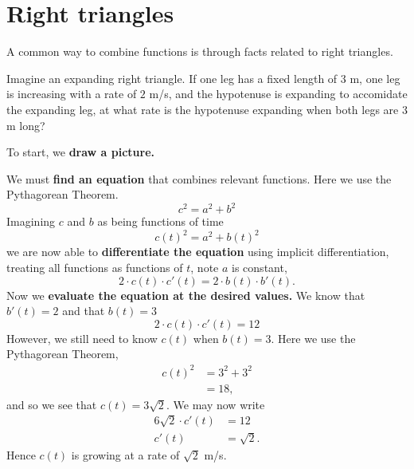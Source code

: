 \documentclass{ximera}
\begin{document}
\section{Right triangles}

A common way to combine functions is through facts related to right
triangles.


\begin{example}
  Imagine an expanding right triangle. If one leg has a fixed length
  of $3$ m, one leg is increasing with a rate of $2$ m/s, and the
  hypotenuse is expanding to accomidate the expanding leg, at what
  rate is the hypotenuse expanding when both legs are $3$ m long?
  \begin{explanation}
    To start, we \textbf{draw a picture.}
    \begin{image}
    \end{image}

    We must \textbf{find an equation} that combines relevant
    functions. Here we use the Pythagorean Theorem.
    \[
    c^2 = a^2 + b^2
    \]
    Imagining $c$ and $b$ as being functions of time
    \[
    c(t)^2 = a^2 + b(t)^2
    \]
    we are now able to \textbf{differentiate the equation} using
    implicit differentiation, treating all functions as functions of
    $t$, note $a$ is constant,
    \[
    2\cdot c(t)\cdot c'(t) = 2\cdot b(t)\cdot b'(t).
    \]
    Now we \textbf{evaluate the equation at the desired values.} We
    know that $b'(t) = 2$ and that $b(t) = 3$
    \[
    2\cdot c(t)\cdot c'(t) = 12
    \]
    However, we still need to know $c(t)$ when $b(t) = 3$. Here we use
    the Pythagorean Theorem,
    \begin{align*}
    c(t)^2 &= 3^2 + 3^2\\
    &=18,
    \end{align*}
    and so we see that $c(t) = 3\sqrt{2}$. We may now write
    \begin{align*}
      6\sqrt{2}\cdot c'(t) &= 12 \\
      c'(t) &= \sqrt{2}.
    \end{align*}
    Hence $c(t)$ is growing at a rate of $\sqrt{2}$ m/s.
  \end{explanation}
\end{example}
\end{document}
